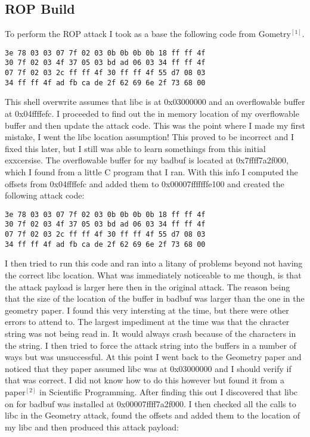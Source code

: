 \documentclass[11pt]{amsart}
\begin{document}
\subsection*{ROP Build}
To perform the ROP attack I took as a base the following code from Gometry$^[1]$.
\begin{verbatim}
3e 78 03 03 07 7f 02 03 0b 0b 0b 0b 18 ff ff 4f 
30 7f 02 03 4f 37 05 03 bd ad 06 03 34 ff ff 4f 
07 7f 02 03 2c ff ff 4f 30 ff ff 4f 55 d7 08 03
34 ff ff 4f ad fb ca de 2f 62 69 6e 2f 73 68 00 
\end{verbatim}
This shell overwrite assumes that libc is at 0x03000000 and an overflowable buffer at 0x04ffffefc.  I proceeded to find out the in memory location of my overflowable buffer and then update the attack code.  This was the point where I made my first mistake, I went the libc location assumption!  This proved to be incorrect and I fixed this later, but I still was able to learn somethings from this initial exxcersise.  The overflowable buffer for my badbuf is located at 0x7ffff7a2f000, which I found from a little C program that I ran.  With this info I computed the offsets from 0x04ffffefc and added them to 0x00007fffffffe100 and created the following attack code:
\begin{verbatim}
3e 78 03 03 07 7f 02 03 0b 0b 0b 0b 18 ff ff 4f 
30 7f 02 03 4f 37 05 03 bd ad 06 03 34 ff ff 4f 
07 7f 02 03 2c ff ff 4f 30 ff ff 4f 55 d7 08 03
34 ff ff 4f ad fb ca de 2f 62 69 6e 2f 73 68 00 
\end{verbatim}
I then tried to run this code and ran into a litany of problems beyond not having the correct libc location.  What was immediately noticeable to me though, is that the attack payload is larger here then in the original attack.  The reason being that the size of the location of the buffer in badbuf was larger than the one in the geometry paper.  I found this very intersting at the time, but there were other errors to attend to.  The largest impediment at the time was that the chracter string was not being read in.  It would always crash because of the characters in the string.  I then tried to force the attack string into the buffers in a number of ways but was unsuccessful.
At this point I went back to the Geometry paper and noticed that they paper assumed libc was at 0x03000000 and I should verify if that was correct.  I did not know how to do this however but found it from a paper$^[2]$ in Scientific Programming.  After finding this out I discovered that libc on for badbuf was installed at 0x00007ffff7a2f000. I then checked all the calls to libc in the Geometry attack, found the offsets and added them to the location of my libc and then produced this attack payload:
\end{document}
